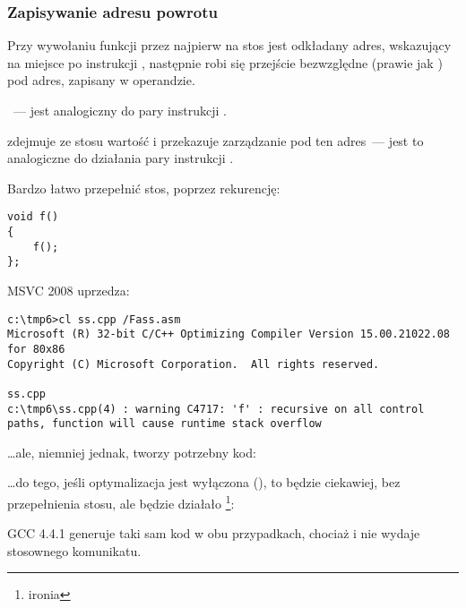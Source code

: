 \subsubsection{Zapisywanie adresu powrotu}


Przy wywołaniu funkcji przez \CALL najpierw na stos jest odkładany adres, wskazujący na miejsce po 
instrukcji \CALL, następnie robi się przejście bezwzględne (prawie jak ) pod adres, zapisany w operandzie.

\CALL~--- jest analogiczny do pary instrukcji .

\RET zdejmuje ze stosu wartość i przekazuje zarządzanie pod ten adres~--- 
jest to analogiczne do działania pary instrukcji .

\myindex{\Stack!\MLStackOverflow}
\myindex{\Recursion}
Bardzo łatwo przepełnić stos, poprzez rekurencję:

\begin{lstlisting}[style=customc]
void f()
{
	f();
};
\end{lstlisting}

MSVC 2008 uprzedza:

\begin{lstlisting}
c:\tmp6>cl ss.cpp /Fass.asm
Microsoft (R) 32-bit C/C++ Optimizing Compiler Version 15.00.21022.08 for 80x86
Copyright (C) Microsoft Corporation.  All rights reserved.

ss.cpp
c:\tmp6\ss.cpp(4) : warning C4717: 'f' : recursive on all control paths, function will cause runtime stack overflow
\end{lstlisting}

\dots ale, niemniej jednak, tworzy potrzebny kod:



\dots do tego, jeśli optymalizacja jest wyłączona (\TT{\Ox}), to będzie ciekawiej, bez przepełnienia stosu, 
ale będzie działało \footnote{ironia}:



GCC 4.4.1 generuje taki sam kod w obu przypadkach, chociaż i nie wydaje stosownego komunikatu.


